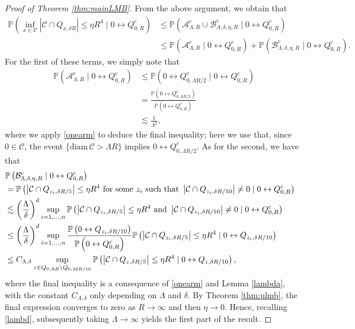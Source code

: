 \documentclass[11pt]{article}
\theoremstyle{definition}
\theoremstyle{remark}
\newcommand{\bP}{\mathbb{P}}
\numberwithin{equation}{section}
\theoremstyle{plain}
\theoremstyle{definition}
\theoremstyle{remark}
\theoremstyle{plain}
\begin{document}
\begin{proof}[Proof of Theorem \ref{thm:mainLMB}]
From the above argument, we obtain that
\begin{align*}
    \bP\left(\inf_{x\in \mathcal{C}}\left|\mathcal{C}\cap Q_{x,\delta R}\right|\leq \eta R^4\mid0\leftrightarrow Q_{0,R}^c\right)&\leq \bP\left(\mathcal{A}_{\Lambda,R}^c\cup\mathcal{B}_{\Lambda,\delta,\eta,R}^c\mid0\leftrightarrow Q_{0,R}^c\right)\\
    &\leq \bP\left(\mathcal{A}_{\Lambda,R}^c\mid0\leftrightarrow Q_{0,R}^c\right)+\bP\left(\mathcal{B}_{\Lambda,\delta,\eta,R}^c\mid0\leftrightarrow Q_{0,R}^c\right).
\end{align*}
For the first of these terms, we simply note that
\begin{align}
\bP\left(\mathcal{A}_{\Lambda,R}^c\mid0\leftrightarrow Q_{0,R}^c\right)&\le\bP\left(0\leftrightarrow Q_{0,\Lambda R/2}^c\mid0\leftrightarrow Q_{0,R}^c\right)\nonumber\\
&=\frac{\bP\left(0\leftrightarrow Q_{0,\Lambda R/2}^c\right)}{\bP\left(0\leftrightarrow Q_{0,R}^c\right)}\nonumber\\
&\lesssim \frac{1}{\Lambda^2},\label{lambd}
\end{align}
where we apply \eqref{onearm} to deduce the final inequality; here we use that, since $0\in\mathcal C$, the event $\{\mathrm{diam}\,\mathcal{C}>\Lambda R\}$ implies $0\leftrightarrow Q^c_{0,\Lambda R/2}$. As for the second, we have that
\begin{align*}
\lefteqn{\bP\left(\mathcal{B}_{\Lambda,\delta,\eta,R}^c\mid0\leftrightarrow Q_{0,R}^c\right)}\\
&=\bP\left(\left|\mathcal{C}\cap Q_{z_i,\delta R/5}\right|\leq  \eta R^4\mbox{ for some $z_i$ such that }
\left|\mathcal{C}\cap Q_{z_i,\delta R/10}\right|\neq 0\mid0\leftrightarrow Q_{0,R}^c\right)\\
&\lesssim \left(\frac{\Lambda}{\delta}\right)^d\sup_{i=1,\dots,n}\bP\left(\left|\mathcal{C}\cap Q_{z_i,\delta R/5}\right|\leq  \eta R^4\mbox{ and }\left|\mathcal{C}\cap Q_{z_i,\delta R/10}\right|\neq0\mid0\leftrightarrow Q_{0,R}^c\right)\\
&\leq \left(\frac{\Lambda}{\delta}\right)^d\sup_{i=1,\dots,n}\frac{\bP\left(0\leftrightarrow Q_{z_i,\delta R/10}\right)}{\bP\left(0\leftrightarrow Q_{0,R}^c\right)}
\bP\left(\left|\mathcal{C}\cap Q_{z_i,\delta R/5}\right|\leq  \eta R^4\mid0\leftrightarrow Q_{z_i,\delta R/10}\right)\\
&\leq C_{\Lambda,\delta}\sup_{z\in Q_{0,\Lambda R}\backslash Q_{0,3\delta R/10}}\bP\left(\left|\mathcal{C}\cap Q_{z,\delta R/5}\right|\leq  \eta R^4\mid0\leftrightarrow Q_{z,\delta R/10}\right),
\end{align*}
where the final inequality is a consequence of \eqref{onearm} and Lemma \ref{lambda}, with the constant $C_{\Lambda,\delta}$ only depending on $\Lambda$ and $\delta$. By Theorem \ref{thm:ulmb}, the final expression converges to zero as $R\rightarrow\infty$ and then $\eta\rightarrow0$. Hence, recalling \eqref{lambd}, subsequently taking $\Lambda\rightarrow \infty$ yields the first part of the result.


\end{proof}
\end{document}
